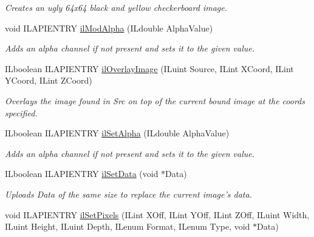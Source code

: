 \begin{DoxyCompactItemize}
\begin{DoxyCompactList}\small\item\em Creates an ugly 64x64 black and yellow checkerboard image. \end{DoxyCompactList}\item 
void I\-L\-A\-P\-I\-E\-N\-T\-R\-Y \hyperlink{group__image__manip_gaca8654129c04ebccba49f71d7e13edfe}{il\-Mod\-Alpha} (I\-Ldouble Alpha\-Value)
\begin{DoxyCompactList}\small\item\em Adds an alpha channel if not present and sets it to the given value. \end{DoxyCompactList}\item 
\hypertarget{group__image__manip_ga2e07d47b40a202e9fdf26d49e8dcdd4c}{I\-Lboolean I\-L\-A\-P\-I\-E\-N\-T\-R\-Y \hyperlink{group__image__manip_ga2e07d47b40a202e9fdf26d49e8dcdd4c}{il\-Overlay\-Image} (I\-Luint Source, I\-Lint X\-Coord, I\-Lint Y\-Coord, I\-Lint Z\-Coord)}\label{group__image__manip_ga2e07d47b40a202e9fdf26d49e8dcdd4c}

\begin{DoxyCompactList}\small\item\em Overlays the image found in Src on top of the current bound image at the coords specified. \end{DoxyCompactList}\item 
I\-Lboolean I\-L\-A\-P\-I\-E\-N\-T\-R\-Y \hyperlink{group__image__manip_ga8887f494b3ed8dc889e783d5e3e3865f}{il\-Set\-Alpha} (I\-Ldouble Alpha\-Value)
\begin{DoxyCompactList}\small\item\em Adds an alpha channel if not present and sets it to the given value. \end{DoxyCompactList}\item 
I\-Lboolean I\-L\-A\-P\-I\-E\-N\-T\-R\-Y \hyperlink{group__image__manip_ga0f4d316f0aa3420fae6817cd8b8c6a7c}{il\-Set\-Data} (void $\ast$Data)
\begin{DoxyCompactList}\small\item\em Uploads Data of the same size to replace the current image's data. \end{DoxyCompactList}\item 
\hypertarget{group__image__manip_gacbb2f4de541d3ea64b2ef079bb78e724}{void I\-L\-A\-P\-I\-E\-N\-T\-R\-Y \hyperlink{group__image__manip_gacbb2f4de541d3ea64b2ef079bb78e724}{il\-Set\-Pixels} (I\-Lint X\-Off, I\-Lint Y\-Off, I\-Lint Z\-Off, I\-Luint Width, I\-Luint Height, I\-Luint Depth, I\-Lenum Format, I\-Lenum Type, void $\ast$Data)}\label{group__image__manip_gacbb2f4de541d3ea64b2ef079bb78e724}


\end{DoxyCompactItemize}
